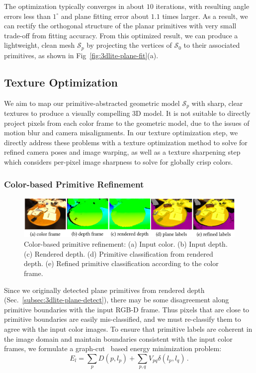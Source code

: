 The optimization typically converges in about $10$ iterations, with resulting angle errors less than $1^{\circ}$ and plane fitting error about $1.1$ times larger. 
As a result, we can rectify the orthogonal structure of the planar primitives with very small trade-off from fitting accuracy.
From this optimized result, we can produce a lightweight, clean mesh $\mathcal{S}_p$ by projecting the vertices of $\mathcal{S}_0$ to their associated primitives, as shown in Fig~\ref{fig:3dlite-plane-fit}(a). 

\subsection{Texture Optimization}
\label{sec:approach-texture}

We aim to map our primitive-abstracted geometric model $\mathcal{S}_p$ with sharp, clear textures to produce a visually compelling 3D model.
It is not suitable to directly project pixels from each color frame to the geometric model, due to the issues of motion blur and camera misalignments.
In our texture optimization step, we directly address these problems with a texture optimization method to solve for refined camera poses and image warping, as well as a texture sharpening step which considers per-pixel image sharpness to solve for globally crisp colors.

\subsubsection{Color-based Primitive Refinement}
\label{subsec:color-plane-refine}
\begin{figure}
    \centering
    \includegraphics[width=\linewidth]{3dlite/fig4.png}
    \caption{Color-based primitive refinement: (a) Input color. (b) Input depth. (c) Rendered depth. (d) Primitive classification from rendered depth. (e) Refined primitive classification according to the color frame.}
    \label{fig:3dlite-color-boundary-refine}
\end{figure}
Since we originally detected plane primitives from rendered depth (Sec.~\ref{subsec:3dlite-plane-detect}), there may be some disagreement along primitive boundaries with the input RGB-D frame.
Thus pixels that are close to primitive boundaries are easily mis-classified, and we must re-classify them to agree with the input color images. 
To ensure that primitive labels are coherent in the image domain and maintain boundaries consistent with the input color frames, we formulate a graph-cut~\cite{boykov2001fast} based energy minimization problem:
\begin{equation}
E_l = \sum_p D(p, l_p) + \sum_{p,q} V_{pq}\delta(l_p,l_q)\,.
\label{eq:color-boundary-refine}
\end{equation}

